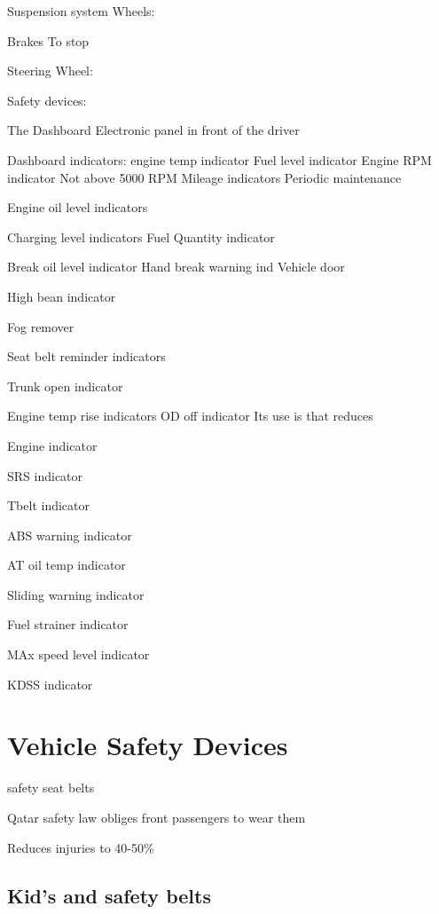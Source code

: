 \documentclass[openany]{book}
\begin{document}
\frontmatter
\tableofcontents
\clearpage

\mainmatter

\raggedright

Suspension system
Wheels:

Brakes
To stop 

Steering Wheel:

Safety devices:


The Dashboard
Electronic panel in front of the driver

Dashboard indicators:
engine temp indicator
Fuel level indicator
Engine RPM indicator
Not above 5000 RPM
Mileage indicators
Periodic maintenance

Engine oil level indicators

Charging level indicators
Fuel Quantity indicator

Break oil level indicator
Hand break warning ind
Vehicle door

High bean indicator

Fog remover

Seat belt reminder indicators

Trunk open indicator

Engine temp rise indicators
OD off indicator
Its use is that reduces 

Engine indicator

SRS indicator

Tbelt indicator

ABS warning indicator

AT oil temp indicator

Sliding warning indicator

Fuel strainer indicator

MAx speed level indicator

KDSS indicator

\chapter{Vehicle Safety Devices}

safety seat belts

Qatar safety law obliges front passengers to wear them

Reduces injuries to 40-50\%

\section{Kid's and safety belts}
\end{document}
